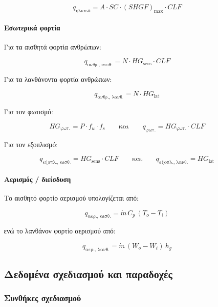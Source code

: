 \documentclass[12pt,a4paper]{article}
\begin{document}
\[
q_{\text{ηλιακό}} = A \cdot SC \cdot (SHGF)_{\max} \cdot CLF
\]

\paragraph{Εσωτερικά φορτία}
Για τα αισθητά φορτία ανθρώπων:

\[
q_{\text{ανθρ., αισθ.}} = N \cdot HG_{\text{sens}} \cdot CLF
\]

Για τα λανθάνοντα φορτία ανθρώπων:

\[
q_{\text{ανθρ., λανθ.}} = N \cdot HG_{\text{lat}}
\]

Για τον φωτισμό:

\[
HG_{\text{φωτ.}} = P \cdot f_u \cdot f_s
\qquad \text{και} \qquad
q_{\text{φωτ.}} = HG_{\text{φωτ.}} \cdot CLF
\]

Για τον εξοπλισμό:

\[
q_{\text{εξοπλ., αισθ.}} = HG_{\text{sens}} \cdot CLF
\qquad \text{και} \qquad
q_{\text{εξοπλ., λανθ.}} = HG_{\text{lat}}
\]

\paragraph{Αερισμός / διείσδυση}
Το αισθητό φορτίο αερισμού υπολογίζεται από:

\[
q_{\text{αερ., αισθ.}} = \dot{m}\, C_p\, (T_o - T_i)
\]

ενώ το λανθάνον φορτίο αερισμού από:

\[
q_{\text{αερ., λανθ.}} = \dot{m}\, (W_o - W_i)\, h_g
\]

\subsection{Δεδομένα σχεδιασμού και παραδοχές}

\subsubsection{Συνθήκες σχεδιασμού}
\end{document}
